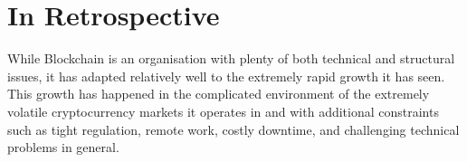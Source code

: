 \documentclass[conference]{IEEEtran}
\begin{document}
    \section{In Retrospective}\label{sec:conclusion}

    While Blockchain is an organisation with plenty of both technical and structural issues, it has adapted relatively well to the extremely rapid growth it has seen.
    This growth has happened in the complicated environment of the extremely volatile cryptocurrency markets it operates in and with additional constraints such as tight regulation, remote work, costly downtime, and challenging technical problems in general.

    \printbibliography
\end{document}
